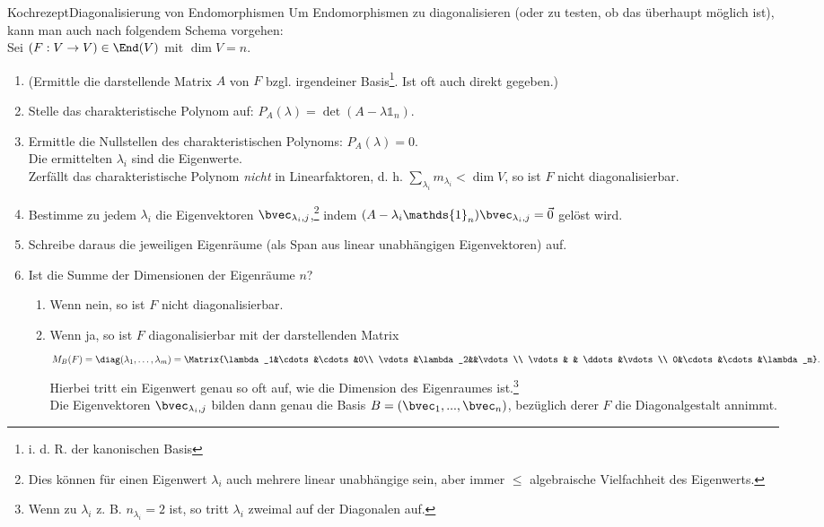 \begin{Satz}
{Kochrezept}{Diagonalisierung von Endomorphismen}
Um Endomorphismen zu diagonalisieren (oder zu testen, ob das überhaupt möglich ist), kann man auch nach folgendem Schema vorgehen:\\
Sei $(F:V\to V)\in\End(V)$ mit $\dim V=n$.
\begin{enumerate}
    \item (Ermittle die darstellende Matrix $A$ von $F$ bzgl. irgendeiner Basis\footnote{i. d. R. der kanonischen Basis}. Ist oft auch direkt gegeben.)
    \item Stelle das charakteristische Polynom auf: $P_A(\lambda)=\det(A-\lambda\mathds{1}_n)$.
    \item Ermittle die Nullstellen des charakteristischen Polynoms: $P_A(\lambda)=0$.\\
    Die ermittelten $\lambda_i$ sind die Eigenwerte.\\
    Zerfällt das charakteristische Polynom \textit{nicht} in Linearfaktoren, d. h. $\sum_{\lambda_i}m_{\lambda_i}<\dim V$, so ist $F$ nicht diagonalisierbar.
    \item Bestimme zu jedem $\lambda_i$ die Eigenvektoren $\bvec_{\lambda_i,j}$,\footnote{Dies können für einen Eigenwert $\lambda_i$ auch mehrere linear unabhängige sein, aber immer $\leq$ algebraische Vielfachheit des Eigenwerts.} indem $(A-\lambda_i\mathds{1}_n)\bvec_{\lambda_i,j}=\Vec{0}$ gelöst wird.
    \item Schreibe daraus die jeweiligen Eigenräume (als Span aus linear unabhängigen Eigenvektoren) auf.
    \item Ist die Summe der Dimensionen der Eigenräume $n$?
    \begin{enumerate}
        \item Wenn nein, so ist $F$ nicht diagonalisierbar.
        \item Wenn ja, so ist $F$ diagonalisierbar mit der darstellenden Matrix
        \begin{equation*}
            M_B(F)=\diag(\lambda_1,\ldots,\lambda_m)=\Matrix{\lambda_1&\cdots&\cdots&0\\
    \vdots&\lambda_2&&\vdots\\
    \vdots& & \ddots &\vdots\\
    0&\cdots&\cdots&\lambda_m}.
        \end{equation*}
        Hierbei tritt ein Eigenwert genau so oft auf, wie die Dimension des Eigenraumes ist.\footnote{Wenn zu $\lambda_i$ z. B. $n_{\lambda_i}=2$ ist, so tritt $\lambda_i$ zweimal auf der Diagonalen auf.}\\
        Die Eigenvektoren $\bvec_{\lambda_i,j}$ bilden dann genau die Basis $B=(\bvec_1,...,\bvec_n)$, bezüglich derer $F$ die Diagonalgestalt annimmt.
    \end{enumerate}
\end{enumerate}
\end{Satz}
